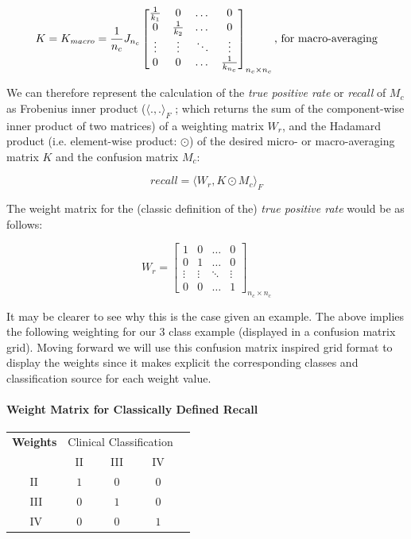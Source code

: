 \documentclass[]{article}
\begin{document}
\[K = K_\textit{macro} = \frac{1}{n_c}J_{n_c}
\begin{bmatrix}
\frac{1}{k_1} & 0 & \dots  & 0 \\
0 & \frac{1}{k_2} & \dots  & 0 \\
\vdots & \vdots & \ddots & \vdots \\
0 & 0 & \dots  & \frac{1}{k_{n_c}}
\end{bmatrix}_{n_c\times n_c}\textmd{, for macro-averaging}\]

\noindent We can therefore represent the calculation of the \textit{true positive rate} or \textit{recall} of $M_c$ as Frobenius inner product ($\langle.,.\rangle_F$ ; which returns the sum of the component-wise inner product of two matrices) of a weighting matrix $W_r$, and the Hadamard product (i.e. element-wise product: $\odot$) of the desired micro- or macro-averaging matrix $K$ and the confusion matrix $M_c$:

\begin{equation}
\textit{recall} = \langle W_r, K \odot M_c \rangle_F
\end{equation}

\noindent The weight matrix for the (classic definition of the) \textit{true positive rate} would be as follows:

\[
W_r = \begin{bmatrix}
1 & 0 & \dots  & 0 \\
0 & 1 & \dots  & 0 \\
\vdots & \vdots & \ddots & \vdots \\
0 & 0 & \dots & 1
\end{bmatrix}_{n_c\times n_c}
\]

\noindent It may be clearer to see why this is the case given an example. The above implies the following weighting for our 3 class example (displayed in a confusion matrix grid). Moving forward we will use this confusion matrix inspired grid format to display the weights since it makes explicit the corresponding classes and classification source for each weight value.

\paragraph{Weight Matrix for Classically Defined Recall}

\begin{center}
	\begin{tabular}{l|l|c|c|c|c}
		\multicolumn{2}{c}{\textbf{Weights}}&\multicolumn{3}{c}{Clinical Classification}\\
		\cline{3-5}
		\multicolumn{2}{c|}{}&II&III&IV\\
		\cline{2-5}
		\multirow{5}{0.8cm}{\rotatebox{90}{\parbox{0.8cm}{\centering Algorithm \\ Classification}}} %
		& II & $1$ & $0$ & $0$\\
		\cline{2-5}
		& III & $0$ & $1$ & $0$\\
		\cline{2-5}
		& IV & $0$ & $0$ & $1$\\
		\cline{2-5}
	\end{tabular}
\end{center}
\end{document}

